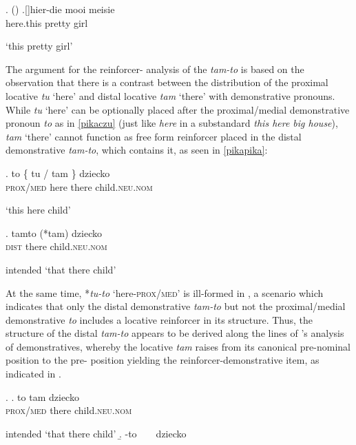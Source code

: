 \ex.  (\citealt[226--227]{Roehrs2010})
\ag.[]\hspace{-22pt}hier-die mooi meisie\\
\hspace{-22pt}here.this pretty girl\\
\hspace{-22pt}\strut `this pretty girl'

The argument for the reinforcer- analysis of the  \textit{tam-to} is based on the observation that there is a contrast between the distribution of the  proximal locative \textit{tu} `here' and distal locative \textit{tam} `there' with demonstrative pronouns. While \textit{tu} `here' can be optionally placed after the  proximal/medial demonstrative pronoun \textit{to} as in \ref{pikaczu}  (just like \textit{here} in a substandard  \textit{this here big house}), \textit{tam} `there' cannot function as free form reinforcer placed in the distal demonstrative \textit{tam-to}, which contains it, as seen in \ref{pikapika}:

\exg. to \{ tu / {tam \}} dziecko\\
\textsc{prox/med} {} here {} there child.\textsc{neu.nom}\\
\strut `this here child'\label{pikaczu}

\exg. tamto (*tam) dziecko\\
\textsc{dist} \phantom{cl}there child.\textsc{neu.nom}\\
\strut intended `that there child'\label{pikapika}

At the same time, *\textit{tu-to} `here-\textsc{prox/med}' is ill-formed in , a scenario which indicates that only the distal demonstrative \textit{tam-to} but not the proximal/medial demonstrative \textit{to} includes a locative reinforcer in its structure. Thus, the structure of the distal \textit{tam-to} appears to be derived along the lines of \citeauthor{Leu2007}'s \citeyearpar{Leu2007} analysis of  demonstratives, whereby the locative \textit{tam} raises from its canonical pre-nominal position to the pre- position yielding the reinforcer-demonstrative item, as indicated in \Next.
 
 \ex.
 \ag. to tam dziecko \\
\textsc{prox/med} there child.\textsc{neu.nom}\\
\strut intended `that there child'
\newlength{\arrowht}
\setlength{\arrowht}{2ex}
\newcommand*\cgdepthstrut{{\vrule height 0pt depth \arrowht width 0pt}}
\renewcommand\eachwordone{\cgdepthstrut\rmfamily}
\renewcommand\glt{\vskip -\topsep}
\let\trans=\glt
\newcommand\arrowex{\setlength{\arrowht}{1ex}\ex}
\b. -to {\ }  {\ } dziecko  

